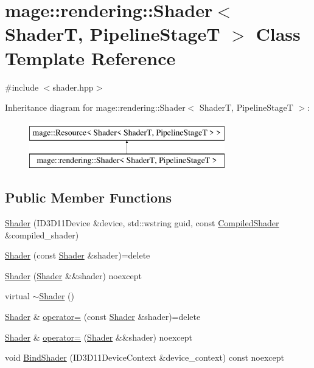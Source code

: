 \hypertarget{classmage_1_1rendering_1_1_shader}{}\section{mage\+:\+:rendering\+:\+:Shader$<$ ShaderT, Pipeline\+StageT $>$ Class Template Reference}
\label{classmage_1_1rendering_1_1_shader}


{\ttfamily \#include $<$shader.\+hpp$>$}

Inheritance diagram for mage\+:\+:rendering\+:\+:Shader$<$ ShaderT, Pipeline\+StageT $>$\+:\begin{figure}[H]
\begin{center}
\leavevmode
\includegraphics[height=2.000000cm]{classmage_1_1rendering_1_1_shader}
\end{center}
\end{figure}
\subsection*{Public Member Functions}
\begin{DoxyCompactItemize}
\item 
\mbox{\hyperlink{classmage_1_1rendering_1_1_shader_ac2cb01b7ce78d43c3c9bae2c91b7990e}{Shader}} (I\+D3\+D11\+Device \&device, std\+::wstring guid, const \mbox{\hyperlink{classmage_1_1rendering_1_1_compiled_shader}{Compiled\+Shader}} \&compiled\+\_\+shader)
\item 
\mbox{\hyperlink{classmage_1_1rendering_1_1_shader_a4ca3a1e4f108e38d28c0ba3df4f234f6}{Shader}} (const \mbox{\hyperlink{classmage_1_1rendering_1_1_shader}{Shader}} \&shader)=delete
\item 
\mbox{\hyperlink{classmage_1_1rendering_1_1_shader_a65ecc5e4958ce06d7dfa8632dccc774f}{Shader}} (\mbox{\hyperlink{classmage_1_1rendering_1_1_shader}{Shader}} \&\&shader) noexcept
\item 
virtual \mbox{\hyperlink{classmage_1_1rendering_1_1_shader_af9774a6a1f073f0477c5f4e35f130181}{$\sim$\+Shader}} ()
\item 
\mbox{\hyperlink{classmage_1_1rendering_1_1_shader}{Shader}} \& \mbox{\hyperlink{classmage_1_1rendering_1_1_shader_a66253b5dd8a5ef1cd766512b4ab15e6c}{operator=}} (const \mbox{\hyperlink{classmage_1_1rendering_1_1_shader}{Shader}} \&shader)=delete
\item 
\mbox{\hyperlink{classmage_1_1rendering_1_1_shader}{Shader}} \& \mbox{\hyperlink{classmage_1_1rendering_1_1_shader_a940217c505f3994d1f6057345d52cb36}{operator=}} (\mbox{\hyperlink{classmage_1_1rendering_1_1_shader}{Shader}} \&\&shader) noexcept
\item 
void \mbox{\hyperlink{classmage_1_1rendering_1_1_shader_abb37464c991b9b49e94c93968e884f13}{Bind\+Shader}} (I\+D3\+D11\+Device\+Context \&device\+\_\+context) const noexcept
\end{DoxyCompactItemize}
